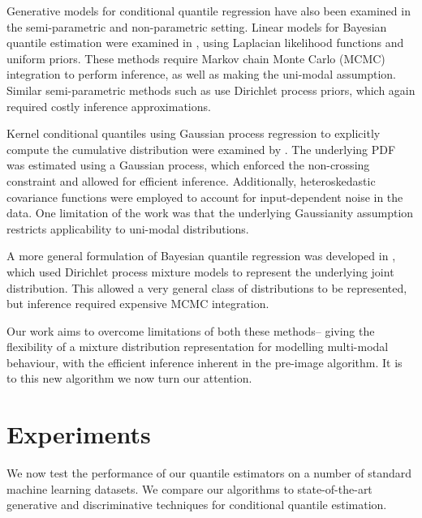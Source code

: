 \documentclass[twoside]{article} \usepackage{aistats2017}
\theoremstyle{definition}
\begin{document}
	Generative models for conditional quantile regression have also been examined in the semi-parametric and non-parametric setting. Linear models for Bayesian quantile estimation were examined in \cite{Yu2001}, using Laplacian likelihood functions and uniform priors. These methods require Markov chain Monte Carlo (MCMC) integration to perform inference, as well as making the uni-modal assumption. Similar semi-parametric methods such as \cite{Hjort2006, Hjort2009} use Dirichlet process priors, which again required costly inference approximations.
	
	Kernel conditional quantiles using Gaussian process regression to explicitly compute the cumulative distribution were examined by \cite{Quadrianto2009}. The underlying PDF was estimated using a Gaussian process, which enforced the non-crossing constraint and allowed for efficient inference. Additionally, heteroskedastic covariance functions were employed to account for input-dependent noise in the data. One limitation of the work was that the underlying Gaussianity assumption restricts applicability to uni-modal distributions.
	
	A more general formulation of Bayesian quantile regression was developed in \cite{Taddy2010}, which used Dirichlet process mixture models to represent the underlying joint distribution. This allowed a very general class of distributions to be represented, but inference required expensive MCMC integration.
	
	
	
	Our work aims to overcome limitations of both these methods-- giving the flexibility of a mixture distribution representation for modelling multi-modal behaviour, with the efficient inference inherent in the pre-image algorithm. It is to this new algorithm we now turn our attention.

\section{Experiments}
\label{sec:experiments}

	We now test the performance of our quantile estimators on a number of standard machine learning datasets. We compare our algorithms to state-of-the-art generative and discriminative techniques for conditional quantile estimation.
	
\end{document}
